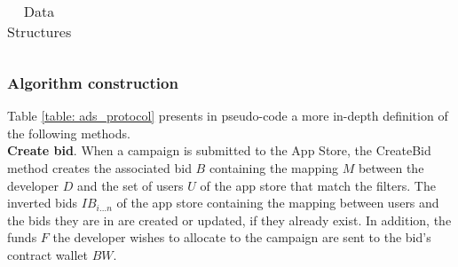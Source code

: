\begin{table}[H]
\begin{tabular}{|p{}p{}|}
\hline
\end{tabular}
\caption{Data Structures}
\label{table: data_structures}
\end{table}




\vspace{0.2cm}

\subsubsection{Algorithm construction}

Table \ref{table: ads_protocol} presents in pseudo-code a more in-depth definition of the following methods. \\

\noindent \textbf{Create bid}. When a campaign is submitted to the App Store, the \textsf{CreateBid} method creates the associated bid $B$ containing the mapping $M$ between the developer $D$ and the set of users $U$ of the app store that match the filters. The inverted bids $IB_{i...n}$ of the app store containing the mapping between users and the bids they are in are created or updated, if they already exist. In addition, the funds $F$ the developer wishes to allocate to the campaign are sent to the bid's contract wallet $BW$. \\

